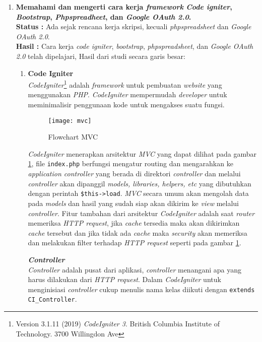 \documentclass[a4paper,twoside]{article}
\begin{document}
\begin{enumerate}
	\item \textbf{Memahami dan mengerti cara kerja \textit{framework} \textit{Code igniter}, \textit{Bootstrap}, \textit{Phpspreadheet}, dan \textit{Google OAuth 2.0}.}\\
	{\bf Status :} Ada sejak rencana kerja skripsi, kecuali \textit{phpspreadsheet} dan \textit{Google OAuth 2.0}.\\
	{\bf Hasil :} Cara kerja \textit{code igniter}, \textit{bootstrap}, \textit{phpspreadsheet}, dan \textit{Google OAuth 2.0} telah dipelajari, Hasil dari studi secara garis besar:
	\begin{enumerate}
		\item \textbf{Code Igniter} \\
		\textit{CodeIgniter}\footnote{Version 3.1.11 (2019) \textit{CodeIgniter 3}. British Columbia Institute of Technology. 3700 Willingdon Ave} adalah \textit{framework} untuk pembuatan \textit{website} yang menggunakan \textit{PHP}. \textit{CodeIgniter} mempermudah \textit{developer} untuk meminimalisir penggunaan kode untuk mengakses suatu fungsi.
		
		\begin{figure}[H]
			\centering
			\texttt{[image: mvc]} 
			\caption{Flowchart MVC}
			\label{fig:appflowchart} 
		\end{figure}
				
		 \textit{CodeIgniter} menerapkan arsitektur \textit{MVC} yang dapat dilihat pada gambar \ref{fig:appflowchart}, file \texttt{index.php} berfungsi mengatur routing dan mengarahkan ke \textit{application controller} yang berada di direktori \textit{controller} dan melalui \textit{controller} akan dipanggil \textit{models, libraries, helpers, etc} yang dibutuhkan dengan perintah \texttt{\$this->load}. \textit{MVC} secara umum akan mengolah data pada \textit{models} dan hasil yang sudah siap akan dikirim ke \textit{view} melalui \textit{controller}. Fitur tambahan dari arsitektur \textit{CodeIgniter} adalah saat \textit{router} memeriksa \textit{HTTP request}, jika \textit{cache} tersedia maka akan dikirimkan \textit{cache} tersebut dan jika tidak ada \textit{cache} maka \textit{security} akan memeriksa dan melakukan filter terhadap \textit{HTTP request} seperti pada gambar \ref{fig:appflowchart}. 
		 
		 \textbf{\textit{Controller}} \\
		 \textit{Controller} adalah pusat dari aplikasi, \textit{controller} menangani apa yang harus dilakukan dari \textit{HTTP request}. Dalam \textit{CodeIgniter} untuk menginisiasi \textit{controller} cukup menulis nama kelas diikuti dengan \texttt{extends CI\_Controller}.
		 

\end{enumerate}
\end{enumerate}
\end{document}
